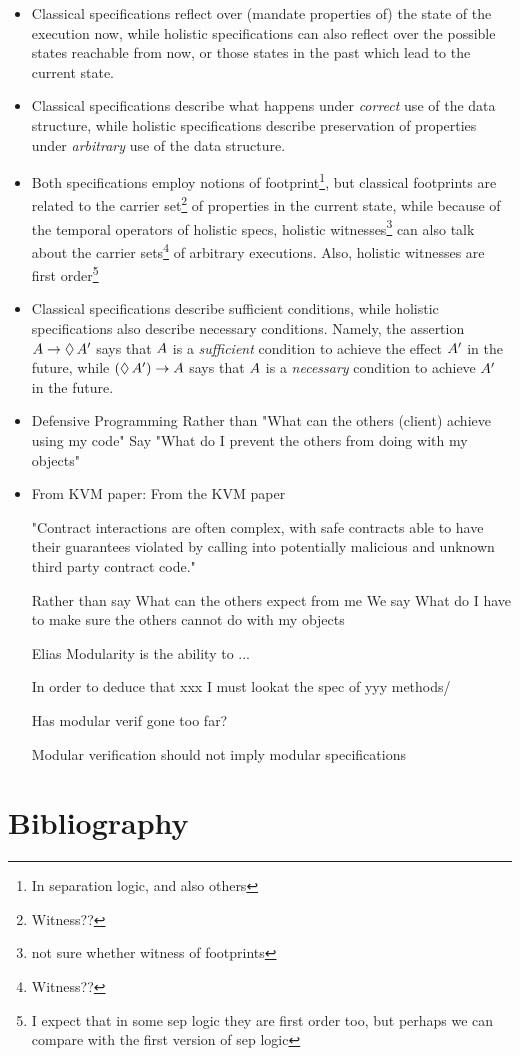 \documentclass[acmsmall,screen]{acmart}
\begin{document}
\begin{itemize}
\item Classical specifications reflect over (\ie mandate properties of) the state of the execution now, while
holistic specifications can also reflect over the possible  states   reachable from now, or those states in the past
which lead to the current state.

\item Classical specifications describe what happens under {\em correct} use  of the data structure,
while holistic specifications  describe preservation of properties under {\em arbitrary} use  of the data structure.

\item Both specifications employ notions of footprint\footnote{In separation logic, and also others}, but
classical footprints are related to the carrier set\footnote{Witness??} of properties in the current state, while
because  of the temporal operators  of holistic specs, holistic witnesses\footnote{not sure whether witness of footprints}
 can  also talk about the carrier sets\footnote{Witness??} of arbitrary executions.
 Also, holistic witnesses are first order\footnote{I expect that in some sep logic they are first order too, but perhaps we
 can compare with the first version of sep logic}



\item Classical specifications describe sufficient conditions, while holistic specifications also describe necessary conditions. 
Namely, the assertion  $A \rightarrow \lozenge\, A'$ says that $A$ is a {\em sufficient} condition to achieve the
effect $A'$ in the future, while $(\lozenge\, A') \rightarrow A$ says that $A$ is a {\em necessary} condition to achieve $A'$ in the future.

\item Defensive Programming Rather than
      "What can the others (client) achieve using my code"
Say
     "What do I prevent the others from doing with my objects"

 \item
 From KVM paper: From the KVM paper

"Contract interactions are often complex, with safe contracts able to have their guarantees violated by calling into potentially malicious and unknown third party contract code."

Rather than say
    What can the others expect from me
We say
    What do I have to make sure the others cannot do with my objects

Elias
    Modularity is the ability to ...

    In order to deduce that xxx I must lookat the spec of yyy methods/

    Has modular verif gone too far?

Modular verification should not imply modular specifications

\end{itemize}




\section*{Bibliography}
 
 
\end{document}
